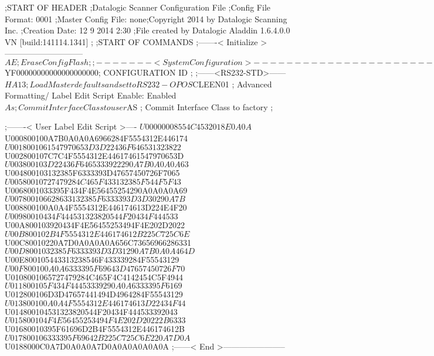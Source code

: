 ;START OF HEADER
;Datalogic Scanner Configuration File
;Config File Format: 0001
;Master Config File: none;Copyright 2014 by Datalogic Scanning Inc.
;Creation Date: 12 9 2014 2:30
;File created by Datalogic Aladdin 1.6.4.0.0 VN [build:141114.1341]
;
;START OF COMMANDS
;-------< Initialize >-----------------------------
$AE                 ; Erase Config Flash
;
;-------< System Configuration >-------------------------------
$YF00000000000000000000; CONFIGURATION ID
;
;------<RS232-STD>------
$HA13               ; Load Master defaults and set to RS232-OPOS
$CLEEN01            ; Advanced Formatting/ Label Edit Script Enable: Enabled
$As                 ; Commit Interface Class to user
$AS                 ; Commit Interface Class to factory
;

;-------< User Label Edit Script >----
$U00000008554C4532018E0A0A
$U000800100A7B0A0A0A6966284F5554312E446174
$U0018001061547970653D3D22436F646531323822
$U002800107C7C4F5554312E44617461547970653D
$U003800103D22436F6465333922290A7B0A0A0A63
$U004800103132385F6333393D47657450726F7065
$U00580010727479284C465F433132385F544F5F43
$U0068001033395F434F4E56455254290A0A0A0A69
$U007800106628633132385F6333393D3D30290A7B
$U008800100A0A4F5554312E446174613D224E4F20
$U00980010434F444531323820544F20434F444533
$U00A800103920434F4E56455253494F4E202D2022
$U00B800102B4F5554312E446174612B225C725C6E
$U00C80010220A7D0A0A0A0A656C73656966286331
$U00D8001032385F6333393D3D31290A7B0A0A464D
$U00E800105443313238546F433339284F55543129
$U00F800100A0A6333395F69643D47657450726F70
$U0108001065727479284C465F4C4142454C5F4944
$U011800105F434F44453339290A0A6333395F6169
$U012800106D3D47657441494D4964284F55543129
$U013800100A0A4F5554312E446174613D22434F44
$U014800104531323820544F20434F444533392043
$U015800104F4E56455253494F4E202D20222B6333
$U01680010395F61696D2B4F5554312E446174612B
$U017800106333395F69642B225C725C6E220A7D0A
$U0188000C0A7D0A0A0A7D0A0A0A0A0A0A
;------< End >-----------------------
